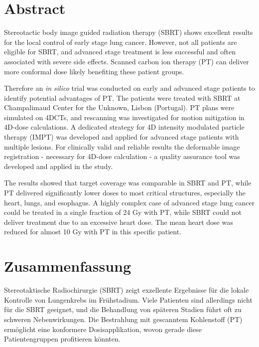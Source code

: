 \section*{Abstract}


Stereotactic body image guided radiation therapy (SBRT) shows excellent results for the local control of early stage lung cancer. 
However, not all patients are eligible for SBRT, and advanced stage treatment is less successful and often associated with severe side effects. 
Scanned carbon ion therapy (PT) can deliver more conformal dose likely benefiting these patient groups.

Therefore an \textit{in silico} trial was conducted on early and advanced stage patients to identify potential advantages of PT. 
The patients were treated with SBRT at Champalimaud Center for the Unknown, Lisbon (Portugal). PT plans were simulated on 4DCTs, 
and rescanning was investigated for motion mitigation in 4D-dose calculations. A dedicated strategy for 4D intensity modulated particle therapy (IMPT)
was developed and applied for advanced stage patients with multiple lesions. For clinically valid and reliable results the deformable 
image registration - necessary for 4D-dose calculation - a quality assurance tool was developed and applied in the study.

The results showed that target coverage was comparable in SBRT and PT, while PT delivered significantly lower doses to 
most critical structures, especially the heart, lungs, and esophagus. A highly complex case of advanced stage lung cancer 
could be treated in a single fraction of 24 Gy with PT, while SBRT could not deliver treatment due to an excessive heart dose. 
The mean heart dose was reduced for almost 10 Gy with PT in this specific patient.



\newpage

\section*{Zusammenfassung}

Stereotaktische Radiochirurgie (SBRT) zeigt exzellente Ergebnisse f\"{u}r die lokale Kontrolle von 
Lungenkrebs im Fr\"{u}hstadium. Viele Patienten sind allerdings nicht f\"{u}r die SBRT geeignet, und die 
Behandlung von sp\"{a}teren Stadien f\"{u}hrt oft zu schweren Nebenwirkungen. Die Bestrahlung mit gescanntem 
Kohlenstoff (PT) erm\"{o}glicht eine konformere Dosisapplikation, wovon gerade diese Patientengruppen 
profitieren k\"{o}nnten.

